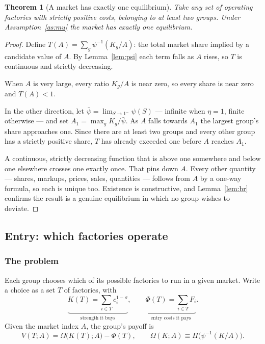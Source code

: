 \documentclass[11pt]{article}
\theoremstyle{plain}
\newtheorem{theorem}{Theorem}
\theoremstyle{remark}
\theoremstyle{definition}
\begin{document}
\begin{theorem}[A market has exactly one equilibrium]\label{thm:market}
Take any set of operating factories with strictly positive costs, belonging to at
least two groups. Under Assumption~\ref{as:mu} the market has exactly one equilibrium.
\end{theorem}

\begin{proof}
Define $T(A)=\sum_g\psi^{-1}(K_g/A)$: the total market share implied by a candidate
value of $A$. By Lemma~\ref{lem:psi} each term falls as $A$ rises, so $T$ is
continuous and strictly decreasing.

When $A$ is very large, every ratio $K_g/A$ is near zero, so every share is near zero
and $T(A)<1$.

In the other direction, let $\bar\psi=\lim_{S\to1^-}\psi(S)$ --- infinite when
$\eta=1$, finite otherwise --- and set $A_1=\max_g K_g/\bar\psi$. As $A$ falls towards
$A_1$ the largest group's share approaches one. Since there are at least two groups
and every other group has a strictly positive share, $T$ has already exceeded one
before $A$ reaches $A_1$.

A continuous, strictly decreasing function that is above one somewhere and below one
elsewhere crosses one exactly once. That pins down $A$. Every other quantity ---
shares, markups, prices, sales, quantities --- follows from $A$ by a one-way formula,
so each is unique too. Existence is constructive, and Lemma~\ref{lem:br} confirms the
result is a genuine equilibrium in which no group wishes to deviate.
\end{proof}

\subsection{Entry: which factories operate}

\subsubsection{The problem}

Each group chooses which of its possible factories to run in a given market. Write a
choice as a set $T$ of factories, with
\[
  \underbrace{K(T)=\sum_{i\in T}c_i^{1-\sigma}}_{\text{strength it buys}},
  \qquad
  \underbrace{\Phi(T)=\sum_{i\in T}F_i}_{\text{entry costs it pays}} .
\]
Given the market index $A$, the group's payoff is
\begin{equation}
  V(T;A)=\Omega\bigl(K(T);A\bigr)-\Phi(T),
  \qquad
  \Omega(K;A)\equiv \Pi\bigl(\psi^{-1}(K/A)\bigr).
  \label{eq:omega}
\end{equation}
\end{document}

